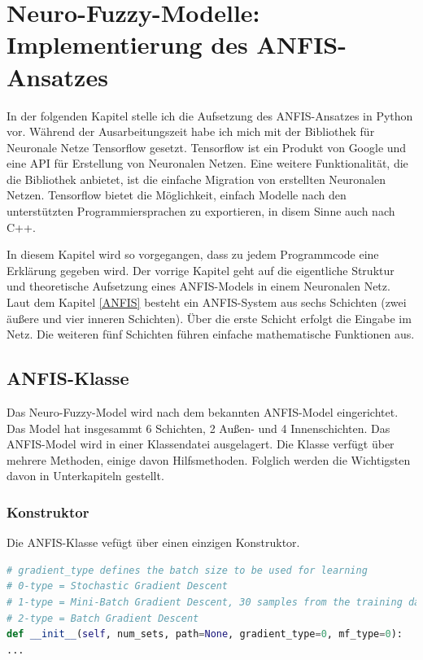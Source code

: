 \chapter{Neuro-Fuzzy-Modelle: Implementierung des ANFIS-Ansatzes}

In der folgenden Kapitel stelle ich die Aufsetzung des ANFIS-Ansatzes in Python vor. Während der Ausarbeitungszeit habe ich mich mit der Bibliothek für Neuronale Netze Tensorflow gesetzt. Tensorflow ist ein Produkt von Google und eine API für Erstellung von Neuronalen Netzen. Eine weitere Funktionalität, die die Bibliothek anbietet, ist die einfache Migration von erstellten Neuronalen Netzen. Tensorflow bietet die Möglichkeit, einfach Modelle nach den unterstützten Programmiersprachen zu exportieren, in disem Sinne auch nach C++.

In diesem Kapitel wird so vorgegangen, dass zu jedem Programmcode eine Erklärung gegeben wird. Der vorrige Kapitel geht auf die eigentliche Struktur und theoretische Aufsetzung eines ANFIS-Models in einem Neuronalen Netz. Laut dem Kapitel \ref{ANFIS} besteht ein ANFIS-System aus sechs Schichten (zwei äußere und vier inneren Schichten). Über die erste Schicht erfolgt die Eingabe im Netz. Die weiteren fünf Schichten führen einfache mathematische Funktionen aus.

\section{ANFIS-Klasse}\label{anfis-klasse}

Das Neuro-Fuzzy-Model wird nach dem bekannten ANFIS-Model eingerichtet. Das Model hat insgesammt 6 Schichten, 2 Außen- und 4 Innenschichten. Das ANFIS-Model wird in einer Klassendatei ausgelagert. Die Klasse verfügt über mehrere Methoden, einige davon Hilfsmethoden. Folglich werden die Wichtigsten davon in Unterkapiteln gestellt.
\subsection{Konstruktor}\label{konstruktor}

Die ANFIS-Klasse vefügt über einen einzigen Konstruktor. 

\begin{lstlisting}[language=Python]
# gradient_type defines the batch size to be used for learning
# 0-type = Stochastic Gradient Descent
# 1-type = Mini-Batch Gradient Descent, 30 samples from the training data
# 2-type = Batch Gradient Descent
def __init__(self, num_sets, path=None, gradient_type=0, mf_type=0):
...
\end{lstlisting}

